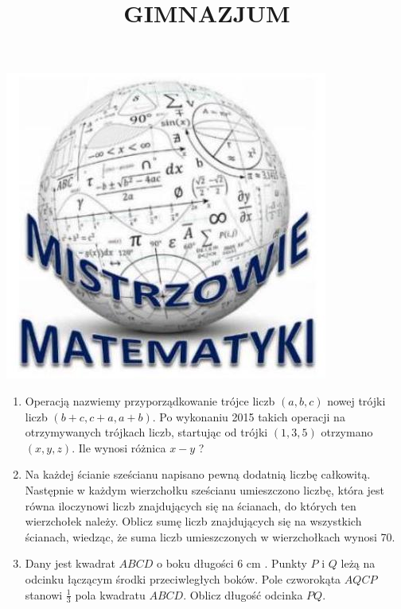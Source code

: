 \documentclass[10pt]{article}
\title{GIMNAZJUM }
\author{}
\date{}
\begin{document}
\maketitle
\begin{center}
\includegraphics[max width=\textwidth]{2024_11_21_aff3155550b8fa0c078dg-1(1)}
\end{center}

\begin{enumerate}
  \item Operacją nazwiemy przyporządkowanie trójce liczb \((a, b, c)\) nowej trójki liczb \((b+c, c+a, a+b)\). Po wykonaniu 2015 takich operacji na otrzymywanych trójkach liczb, startując od trójki \((1,3,5)\) otrzymano \((x, y, z)\). Ile wynosi różnica \(x-y\) ?
  \item Na każdej ścianie sześcianu napisano pewną dodatnią liczbę całkowitą. Następnie w każdym wierzchołku sześcianu umieszczono liczbę, która jest równa iloczynowi liczb znajdujących się na ścianach, do których ten wierzchołek należy. Oblicz sumę liczb znajdujących się na wszystkich ścianach, wiedząc, że suma liczb umieszczonych w wierzchołkach wynosi 70.
  \item Dany jest kwadrat \(A B C D\) o boku długości 6 cm . Punkty \(P\) i \(Q\) leżą na odcinku łączącym środki przeciwległych boków. Pole czworokąta \(A Q C P\) stanowi \(\frac{1}{3}\) pola kwadratu \(A B C D\). Oblicz długość odcinka \(P Q\).
\end{enumerate}
\end{document}
